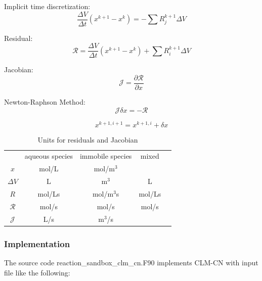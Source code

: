 \documentclass[12pt, a4paper]{article}
\begin{document}
Implicit time discretization:
\begin{equation}
\frac{\Delta V}{\Delta t} \left(x^{k+1} - x^k\right) = - \sum R_j^{k+1} \Delta V
\end{equation}

Residual:
\begin{equation}
\mathcal{R} = \frac{\Delta V}{\Delta t} \left(x^{k+1} - x^k\right)  + \sum R_i^{k+1} \Delta V
\end{equation}

Jacobian:
\begin{equation}
\mathcal{J} =\frac{\partial \mathcal{R}}{\partial x}
\end{equation}


Newton-Raphson Method:
\begin{equation}
\mathcal{J} \delta x = -\mathcal{R}
\end{equation}

\begin{equation}
x^{k+1,i+1} = x^{k+1,i}+ \delta x
\end{equation}

\begin{table}[h]
\caption{Units for residuals and Jacobian}
\begin{center}
\begin{tabular}{ccccc}
                             & aqueous species & immobile species & mixed\\
$x$                      &  mol/L      & mol/m$^3$ &   \\               
$\Delta V$          &  L   & m$^3$  & L \\
$R$                     &  mol/Ls & mol/m$^3$s  & mol/Ls \\
$\mathcal{R}$   & mol/s       & mol/s & mol/s \\ 
$\mathcal{J}$    & L/s & m$^3$/s & \\
\end{tabular}
\end{center}
\label{units}
\end{table}

\subsubsection{Implementation}
The source code reaction\_sandbox\_clm\_cn.F90 implements CLM-CN with input file like the following: 
\end{document}

